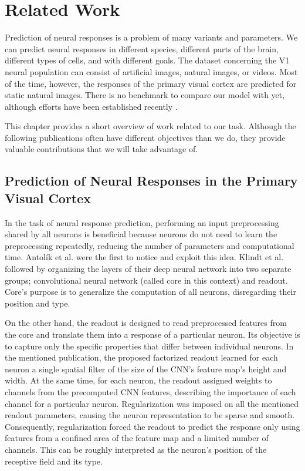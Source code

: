 \chapter{Related Work}

Prediction of neural responses is a problem of many variants and parameters. We can predict neural responses in different species, different parts of the brain, different types of cells, and with different goals. The dataset concerning the V1 neural population can consist of artificial images, natural images, or videos. Most of the time, however, the responses of the primary visual cortex are predicted for static natural images. There is no benchmark to compare our model with yet, although efforts have been established recently \citep{willeke2022sensorium}.

This chapter provides a short overview of work related to our task. Although the following publications often have different objectives than we do, they provide valuable contributions that we will take advantage of.

\section{Prediction of Neural Responses in the Primary Visual Cortex}

In the task of neural response prediction, performing an input preprocessing shared by all neurons is beneficial because neurons do not need to learn the preprocessing repeatedly, reducing the number of parameters and computational time. Antolík et al. \citep{antolik2016model} were the first to notice and exploit this idea. Klindt et al. \citep{klindt2017neural} followed by organizing the layers of their deep neural network into two separate groups; convolutional neural network (called core in this context) and readout. Core's purpose is to generalize the computation of all neurons, disregarding their position and type.

On the other hand, the readout is designed to read preprocessed features from the core and translate them into a response of a particular neuron. Its objective is to capture only the specific properties that differ between individual neurons. In the mentioned publication, the proposed factorized readout learned for each neuron a single spatial filter of the size of the CNN’s feature map’s height and width. At the same time, for each neuron, the readout assigned weights to channels from the precomputed CNN features, describing the importance of each channel for a particular neuron. Regularization was imposed on all the mentioned readout parameters, causing the neuron representation to be sparse and smooth. Consequently, regularization forced the readout to predict the response only using features from a confined area of the feature map and a limited number of channels. This can be roughly interpreted as the neuron’s position of the receptive field and its type.

